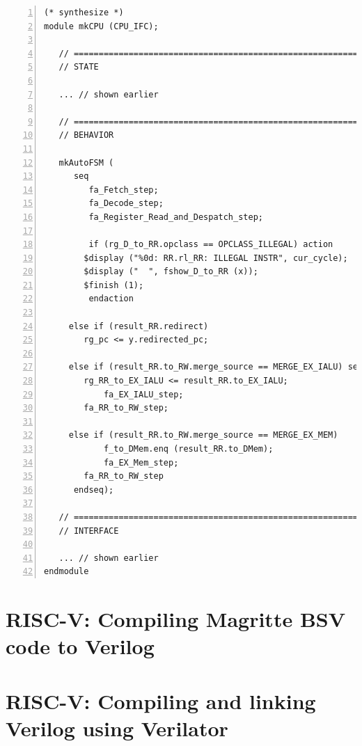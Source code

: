 \begin{Verbatim}[frame=single, numbers=left]
(* synthesize *)
module mkCPU (CPU_IFC);

   // ================================================================
   // STATE

   ... // shown earlier

   // ================================================================
   // BEHAVIOR

   mkAutoFSM (
      seq
         fa_Fetch_step;
         fa_Decode_step;
         fa_Register_Read_and_Despatch_step;

         if (rg_D_to_RR.opclass == OPCLASS_ILLEGAL) action
	    $display ("%0d: RR.rl_RR: ILLEGAL INSTR", cur_cycle);
	    $display ("  ", fshow_D_to_RR (x));
	    $finish (1);
         endaction

	 else if (result_RR.redirect)
	    rg_pc <= y.redirected_pc;

	 else if (result_RR.to_RW.merge_source == MERGE_EX_IALU) seq
	    rg_RR_to_EX_IALU <= result_RR.to_EX_IALU;
            fa_EX_IALU_step;
	    fa_RR_to_RW_step;

	 else if (result_RR.to_RW.merge_source == MERGE_EX_MEM)
            f_to_DMem.enq (result_RR.to_DMem);
            fa_EX_Mem_step;
	    fa_RR_to_RW_step
      endseq);

   // ================================================================
   // INTERFACE

   ... // shown earlier
endmodule

\end{Verbatim}


\section{RISC-V: Compiling Magritte BSV code to Verilog}

\label{Sec_FSMs_Magritte_compile_to_verilog}


\section{RISC-V: Compiling and linking Verilog using Verilator}

\label{Sec_FSMs_Magritte_verilator}


